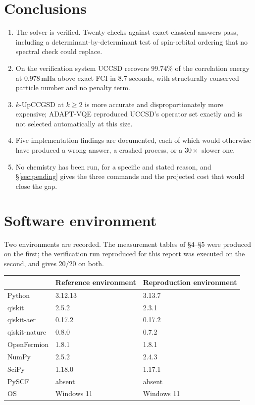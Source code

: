 \documentclass[11pt,a4paper]{article}
\newcommand{\mHa}{\ensuremath{\,\mathrm{mHa}}}
\begin{document}
\section{Conclusions}

\begin{enumerate}[leftmargin=1.4em,itemsep=0.25em]

\item The solver is verified. Twenty checks against exact classical answers
  pass, including a determinant-by-determinant test of spin-orbital ordering
  that no spectral check could replace.

\item On the verification system UCCSD recovers $99.74\%$ of the correlation
  energy at $0.978\mHa$ above exact FCI in $8.7$ seconds, with structurally
  conserved particle number and no penalty term.

\item $k$-UpCCGSD at $k \geq 2$ is more accurate and disproportionately more
  expensive; ADAPT-VQE reproduced UCCSD's operator set exactly and is not
  selected automatically at this size.

\item Five implementation findings are documented, each of which would
  otherwise have produced a wrong answer, a crashed process, or a
  $30\times$ slower one.

\item No chemistry has been run, for a specific and stated reason, and
  \S\ref{sec:pending} gives the three commands and the projected cost that would
  close the gap.

\end{enumerate}

\appendix

\section{Software environment}

Two environments are recorded. The measurement tables of \S4--\S5 were produced
on the first; the verification run reproduced for this report was executed on the
second, and gives $20/20$ on both.

\begin{center}
\small
\begin{tabular}{lll}
\toprule
& Reference environment & Reproduction environment \\
\midrule
Python      & 3.12.13 & 3.13.7 \\
qiskit      & 2.5.2   & 2.3.1 \\
qiskit-aer  & 0.17.2  & 0.17.2 \\
qiskit-nature & 0.8.0 & 0.7.2 \\
OpenFermion & 1.8.1   & 1.8.1 \\
NumPy       & 2.5.2   & 2.4.3 \\
SciPy       & 1.18.0  & 1.17.1 \\
PySCF       & absent  & absent \\
OS          & Windows 11 & Windows 11 \\
\bottomrule
\end{tabular}
\end{center}
\end{document}

